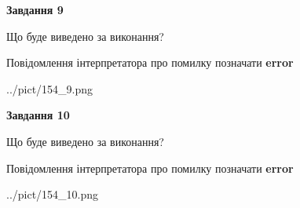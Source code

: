 \documentclass[12pt, ukrainian]{article}
\begin{document}
{{\begin {center}\textbf{Завдання 9}\end {center}}\par
Що буде виведено за виконання? \par
Повідомлення інтерпретатора про помилку позначати \textbf{error}

\begin{center}
	{../pict/154_9.png}
\end{center}
\newpage

{\begin {center}\textbf{Завдання 10}\end {center}}\par
Що буде виведено за виконання? \par
Повідомлення інтерпретатора про помилку позначати \textbf{error}

\begin{center}
	{../pict/154_10.png}
\end{center}
\newpage

}
\end{document}
